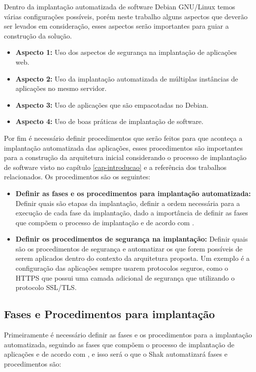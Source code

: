 Dentro da implantação automatizada de software Debian GNU/Linux temos várias
configurações possíveis, porém neste trabalho alguns aspectos que deverão ser levados em
consideração, esses aspectos serão importantes para guiar a construção da solução.

\begin{itemize}
  \item  \textbf{Aspecto 1:} Uso dos aspectos de segurança na implantação de aplicações web.
  \item  \textbf{Aspecto 2:} Uso da implantação automatizada de múltiplas instâncias de
   aplicações no mesmo servidor.
  \item  \textbf{Aspecto 3:} Uso de aplicações que são empacotadas no Debian.
  \item  \textbf{Aspecto 4:} Uso de boas práticas de implantação de software.
\end{itemize}

Por fim é necessário definir procedimentos que serão
feitos para que aconteça a implantação automatizada das aplicações, esses procedimentos são
importantes para a construção da arquitetura inicial considerando
o processo de implantação de software visto no capítulo \ref{cap-introducao}
e a referência dos trabalhos relacionados. Os procedimentos são os seguintes:

\begin{itemize}
  \item  \textbf{Definir as fases e os procedimentos para implantação automatizada:}
   Definir quais são etapas da implantação, definir a ordem necessária para a execução de
  cada fase da implantação, dado a importância de definir as fases que compõem o processo de
  implantação e de acordo com \cite{omg2006}.
  \item  \textbf{Definir os procedimentos de segurança na implantação:} Definir
  quais são os procedimentos de segurança e automatizar os que forem possíveis
  de serem aplicados dentro do contexto da arquitetura proposta. Um exemplo
  é a configuração das aplicações sempre usarem protocolos seguros, como o HTTPS
  que possui uma camada adicional de segurança que utilizando o protocolo SSL/TLS.
\end{itemize}

\subsection{Fases e Procedimentos para implantação}

Primeiramente é necessário definir as fases e os procedimentos para a implantação automatizada,
seguindo as fases que compõem o processo de implantação de aplicações e de acordo
com \cite{omg2006}, e isso será o que o Shak automatizará fases e procedimentos são:

